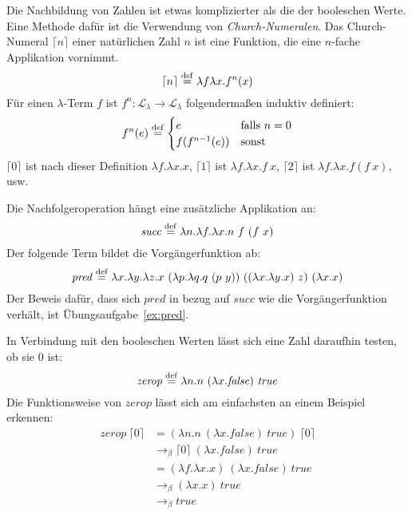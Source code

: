 Die Nachbildung von Zahlen ist etwas komplizierter als die der
booleschen Werte.  Eine Methode dafür ist
die Verwendung von \textit{Church-Numeralen}.  Das
Church-Numeral $\lceil n\rceil$ einer natürlichen Zahl
$n$ ist eine Funktion, die eine $n$-fache Applikation vornimmt.
%
\begin{displaymath}
  \lceil n\rceil \stackrel{\rm def}{=}{} \lambda f\lambda x.f^n(x)
\end{displaymath}
Für einen $\lambda$-Term $f$ ist $f^n : \mathcal{L}_{\lambda}\rightarrow\mathcal{L}_{\lambda}$ folgendermaßen induktiv definiert:
%
\begin{displaymath}
  f^n(e) \stackrel{\rm def}{=}
  \begin{cases}
    e & \text{falls } n = 0\\
    f(f^{n-1}(e)) & \text{sonst}
  \end{cases}
\end{displaymath}
%
$\lceil 0\rceil$ ist nach dieser Definition
$\lambda f.\lambda x.x$, $\lceil 1\rceil$ ist $\lambda f.\lambda x.f~x$,
$\lceil 2\rceil$ ist $\lambda f.\lambda x.f(f~x)$, usw.

Die Nachfolgeroperation hängt eine zusätzliche Applikation an:
%
\begin{displaymath}
  \mathit{succ} \stackrel{\rm def}{=}{} \lambda n.\lambda f.\lambda x.n~f~(f~x)
\end{displaymath}
%
Der folgende Term bildet die Vorgängerfunktion ab:
%
\begin{displaymath}
  \mathit{pred} \stackrel{\rm def}{=}{} \lambda x.\lambda y.\lambda z.x~(\lambda p.\lambda
  q.q~(p~y))~((\lambda x.\lambda y.x)~z)~(\lambda x.x)
\end{displaymath}
%
Der Beweis dafür, dass sich $\mathit{pred}$ in bezug auf $\mathit{succ}$ wie die
Vorgängerfunktion verhält, ist Übungsaufgabe~\ref{ex:pred}.

In Verbindung mit den booleschen Werten lässt sich eine Zahl daraufhin
testen, ob sie $0$ ist:
%
\begin{displaymath}
  \mathit{zerop} \stackrel{\rm def}{=}{} \lambda n.n~(\lambda x.\mathit{false})~\mathit{true}
\end{displaymath}
%
Die Funktionsweise von $\mathit{zerop}$ lässt sich am einfachsten an
einem Beispiel erkennen:
%
\begin{displaymath}
  \begin{split}
    \mathit{zerop}~\lceil 0\rceil & =
    (\lambda n.n~(\lambda x.\mathit{false})~\mathit{true})~\lceil 0\rceil\\
    & \rightarrow_\beta \lceil 0\rceil~(\lambda x.\mathit{false})~\mathit{true}\\
    & = (\lambda f.\lambda x.x)~(\lambda x.\mathit{false})~\mathit{true}\\
    & \rightarrow_\beta (\lambda x.x)~\mathit{true}\\
    & \rightarrow_\beta \mathit{true}
  \end{split}
\end{displaymath}
%

